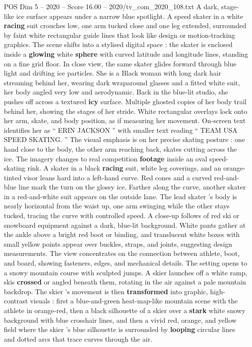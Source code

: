 \begin{textsample}{POS Dim 5 – 2020 – Score 16.00 – 2020/tv\_com\_2020\_108.txt}  \label{ex:f5_pos_061}
A dark, stage-like ice surface appears under a narrow blue spotlight.
A speed skater in a white \textbf{racing} suit crouches low, one arm tucked close and one leg extended, surrounded by faint white rectangular guide lines that look like design or motion-tracking graphics.
The scene shifts into a stylised digital space : the skater is enclosed inside a \textbf{glowing} white \textbf{sphere} with curved latitude and longitude lines, standing on a fine grid floor.
In close view, the same skater glides forward through blue light and drifting ice particles.
She is a Black woman with long dark hair streaming behind her, wearing dark wraparound glasses and a fitted white suit, her body angled very low and aerodynamic.
Back in the blue-lit studio, she pushes off across a textured \textbf{icy} surface.
Multiple ghosted copies of her body trail behind her, showing the stages of her stride.
White rectangular overlays lock onto her arm, skate, and body position, as if measuring her movement.
On-screen text identifies her as “ ERIN JACKSON ” with smaller text reading “ TEAM USA SPEED SKATING. ” The visual emphasis is on her precise skating posture : one hand close to the body, the other arm reaching back, skates cutting across the ice.
The imagery changes to real competition \textbf{footage} inside an oval speed-skating rink.
A skater in a black \textbf{racing} suit, white leg coverings, and an orange-tinted visor leans hard into a left-hand curve.
Red cones and a curved red-and-blue line mark the turn on the glossy ice.
Farther along the curve, another skater in a red-and-white suit appears on the outside lane.
The lead skater ’s body is nearly horizontal from the waist up, one arm swinging while the other stays tucked, tracing the curve with controlled speed.
A close-up follows of red ski or snowboard equipment against a dark, blue-lit background.
White pants gather at the ankle above a bright red boot or binding, and translucent white boxes with small yellow points appear over buckles, straps, and joints, suggesting design measurements.
The view concentrates on the connection between athlete, boot, and board, showing fasteners, edges, and mechanical details.
The setting opens to a snowy mountain course with sculpted jumps.
A skier launches off a white ramp, skis \textbf{crossed} or angled beneath them, rotating in the air against a pale mountain backdrop.
The skier ’s movement is then \textbf{transformed} into graphic, high-contrast visuals : first a blue-and-green heat-map-like mountain scene with the athlete in orange-red, then a black silhouette of a skier over a \textbf{stark} white snowy background with blue crosshair lines, and then a vivid red, orange, and yellow field where the skier ’s blue silhouette is surrounded by \textbf{looping} circular lines and dotted arcs that trace curves through the air.

\end{textsample}
